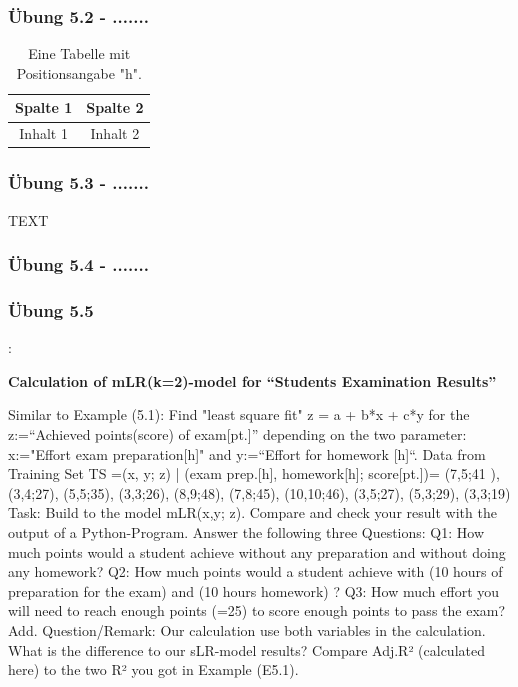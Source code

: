 \documentclass[12pt]{article}
\begin{document}



\subsubsection{Übung 5.2 - .......}


\begin{table}[h] %
  \centering
  \begin{tabular}{|c|c|}
    \hline
    Spalte 1 & Spalte 2 \\
    \hline
    Inhalt 1 & Inhalt 2 \\
    \hline
  \end{tabular}
  \caption{Eine Tabelle mit Positionsangabe "h".}
  \label{tab:tabelle_h}
\end{table}


\subsubsection{Übung 5.3 - .......}
TEXT\\
\subsubsection{Übung 5.4 - .......}

\subsubsection{Übung 5.5}:

\textbf{Calculation of  mLR(k=2)-model for “Students Examination Results”}

Similar to Example (5.1): Find "least square fit" z = a + b*x + c*y for the z:=“Achieved points(score) of exam[pt.]” depending on the two parameter: x:="Effort exam preparation[h]" and y:=“Effort for homework [h]“. Data from Training Set TS  ={(x, y; z) | (exam prep.[h], homework[h]; score[pt.])}= {(7,5;41 ), (3,4;27), (5,5;35), (3,3;26), (8,9;48), (7,8;45), (10,10;46), (3,5;27), (5,3;29), (3,3;19)}
Task: Build to the model mLR(x,y; z). Compare and check your result with the output of a Python-Program.
Answer the following three Questions: 
Q1: How much points would a student achieve without any preparation and without doing any homework? 
Q2: How much points would a student achieve with (10 hours of preparation for the exam) and (10 hours homework) ? 
Q3: How much effort you will need to reach enough points (=25) to score enough points to pass the exam? 
Add. Question/Remark: Our calculation use both variables in the calculation. What is the difference to our sLR-model results? Compare Adj.R² (calculated here) to the two R² you got in Example (E5.1).
\end{document}
